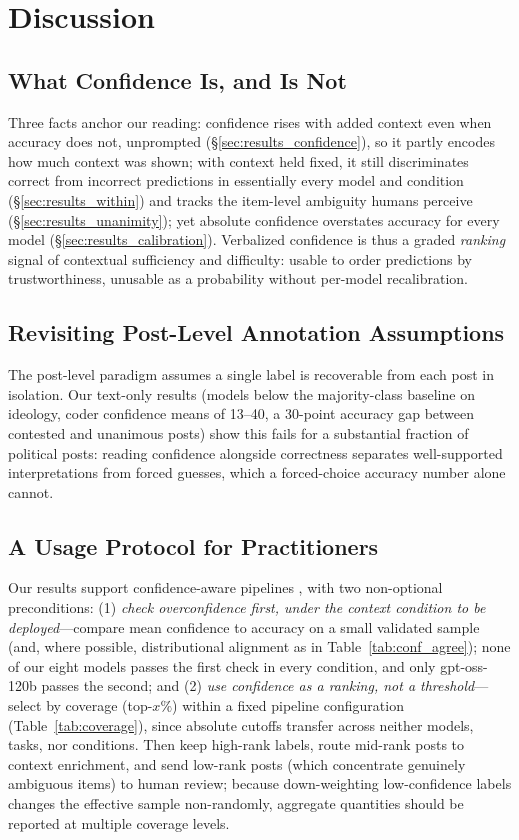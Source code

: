 \documentclass[11pt]{article}
\begin{document}
\section{Discussion}
\label{sec:discussion}

\subsection{What Confidence Is, and Is Not}

Three facts anchor our reading: confidence rises with added context even when accuracy does not, unprompted (§\ref{sec:results_confidence}), so it partly encodes how much context was shown; with context held fixed, it still discriminates correct from incorrect predictions in essentially every model and condition (§\ref{sec:results_within}) and tracks the item-level ambiguity humans perceive (§\ref{sec:results_unanimity}); yet absolute confidence overstates accuracy for every model (§\ref{sec:results_calibration}). Verbalized confidence is thus a graded \emph{ranking} signal of contextual sufficiency and difficulty: usable to order predictions by trustworthiness, unusable as a probability without per-model recalibration.

\subsection{Revisiting Post-Level Annotation Assumptions}

The post-level paradigm assumes a single label is recoverable from each post in isolation. Our text-only results (models below the majority-class baseline on ideology, coder confidence means of 13--40, a 30-point accuracy gap between contested and unanimous posts) show this fails for a substantial fraction of political posts: reading confidence alongside correctness separates well-supported interpretations from forced guesses, which a forced-choice accuracy number alone cannot.

\subsection{A Usage Protocol for Practitioners}

Our results support confidence-aware pipelines \cite{gligoric_can_2025, kamath_selective_2020}, with two non-optional preconditions:
(1) \emph{check overconfidence first, under the context condition to be deployed}---compare mean confidence to accuracy on a small validated sample (and, where possible, distributional alignment as in Table~\ref{tab:conf_agree}); none of our eight models passes the first check in every condition, and only gpt-oss-120b passes the second; and
(2) \emph{use confidence as a ranking, not a threshold}---select by coverage (top-$x\%$) within a fixed pipeline configuration (Table~\ref{tab:coverage}), since absolute cutoffs transfer across neither models, tasks, nor conditions.
Then keep high-rank labels, route mid-rank posts to context enrichment, and send low-rank posts (which concentrate genuinely ambiguous items) to human review; because down-weighting low-confidence labels changes the effective sample non-randomly, aggregate quantities should be reported at multiple coverage levels.
\end{document}
